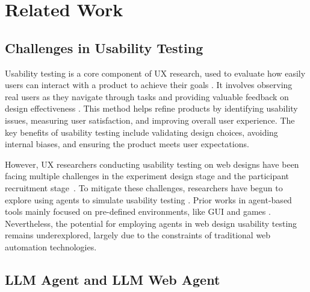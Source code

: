 \section{Related Work}
\subsection{Challenges in Usability Testing}
Usability testing is a core component of UX research, used to evaluate how easily users can interact with a product to achieve their goals \cite{shawHandbookUsabilityTesting1996a,barnum2020usability, bastienUsabilityTestingReview2010, lewis2012usability}.
It involves observing real users as they navigate through tasks and providing valuable feedback on design effectiveness \cite{barnum2020usability}. 
This method helps refine products by identifying usability issues, measuring user satisfaction, and improving overall user experience. The key benefits of usability testing include validating design choices, avoiding internal biases, and ensuring the product meets user expectations.

However, UX researchers conducting usability testing on web designs have been facing multiple challenges in the experiment design stage and the participant recruitment stage~\cite{folstadAnalysisPracticalUsability2012, hertzumEvaluatorEffectChilling2003, kuangMergingResultsNo2022, norgaardWhatUsabilityEvaluators2006}.
To mitigate these challenges, researchers have begun to explore using agents to simulate usability testing \cite{ren2014agent}.
Prior works in agent-based tools mainly focused on pre-defined environments, like GUI \cite{eskonenAutomatingGUITesting2020} and games \cite{stahlkeArtificialPlayfulnessTool2019,fernandesAgentsAutomatedUser2021}.
Nevertheless, the potential for employing agents in web design usability testing remains underexplored, largely due to the constraints of traditional web automation technologies.

\subsection{LLM Agent and LLM Web Agent}

